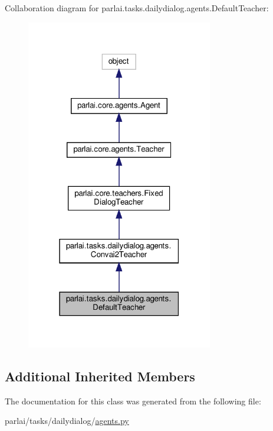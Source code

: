 Collaboration diagram for parlai.\+tasks.\+dailydialog.\+agents.\+Default\+Teacher\+:
\nopagebreak
\begin{figure}[H]
\begin{center}
\leavevmode
\includegraphics[width=231pt]{classparlai_1_1tasks_1_1dailydialog_1_1agents_1_1DefaultTeacher__coll__graph}
\end{center}
\end{figure}
\subsection*{Additional Inherited Members}


The documentation for this class was generated from the following file\+:\begin{DoxyCompactItemize}
\item 
parlai/tasks/dailydialog/\hyperlink{parlai_2tasks_2dailydialog_2agents_8py}{agents.\+py}\end{DoxyCompactItemize}
